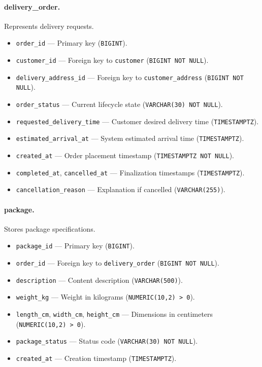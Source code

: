 \paragraph{delivery\_order.}
Represents delivery requests.
\begin{itemize}
    \item \texttt{order\_id} — Primary key (\texttt{BIGINT}).
    \item \texttt{customer\_id} — Foreign key to \texttt{customer} (\texttt{BIGINT NOT NULL}).
    \item \texttt{delivery\_address\_id} — Foreign key to \texttt{customer\_address} (\texttt{BIGINT NOT NULL}).
    \item \texttt{order\_status} — Current lifecycle state (\texttt{VARCHAR(30) NOT NULL}).
    \item \texttt{requested\_delivery\_time} — Customer desired delivery time (\texttt{TIMESTAMPTZ}).
    \item \texttt{estimated\_arrival\_at} — System estimated arrival time (\texttt{TIMESTAMPTZ}).
    \item \texttt{created\_at} — Order placement timestamp (\texttt{TIMESTAMPTZ NOT NULL}).
    \item \texttt{completed\_at}, \texttt{cancelled\_at} — Finalization timestamps (\texttt{TIMESTAMPTZ}).
    \item \texttt{cancellation\_reason} — Explanation if cancelled (\texttt{VARCHAR(255)}).
\end{itemize}

\paragraph{package.}
Stores package specifications.
\begin{itemize}
    \item \texttt{package\_id} — Primary key (\texttt{BIGINT}).
    \item \texttt{order\_id} — Foreign key to \texttt{delivery\_order} (\texttt{BIGINT NOT NULL}).
    \item \texttt{description} — Content description (\texttt{VARCHAR(500)}).
    \item \texttt{weight\_kg} — Weight in kilograms (\texttt{NUMERIC(10,2) > 0}).
    \item \texttt{length\_cm}, \texttt{width\_cm}, \texttt{height\_cm} — Dimensions in centimeters (\texttt{NUMERIC(10,2) > 0}).
    \item \texttt{package\_status} — Status code (\texttt{VARCHAR(30) NOT NULL}).
    \item \texttt{created\_at} — Creation timestamp (\texttt{TIMESTAMPTZ}).
\end{itemize}

